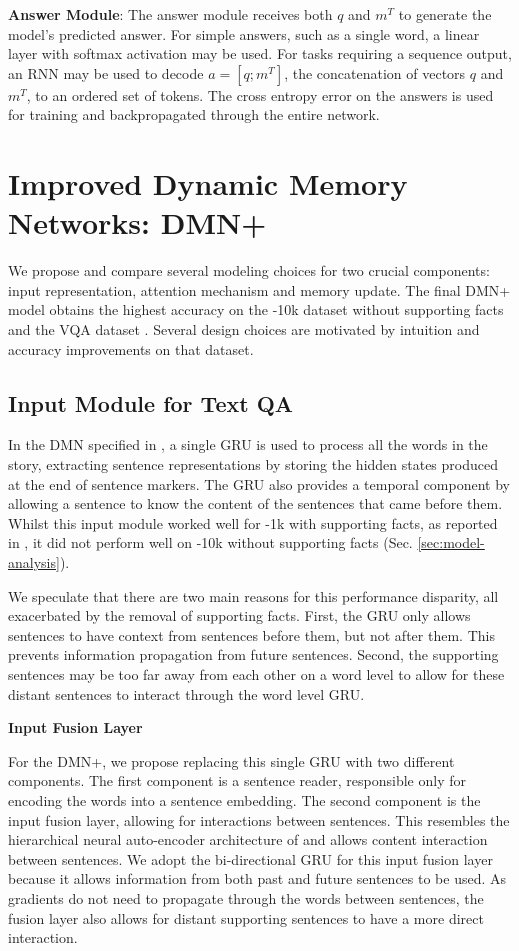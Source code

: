 \documentclass{article}
\begin{document}
\textbf{Answer Module}:
The answer module receives both $q$ and $m^T$ to generate the model's predicted answer.
For simple answers, such as a single word, a linear layer with softmax activation may be used.
For tasks requiring a sequence output, an RNN may be used to decode $a = [q ; m^T]$, the concatenation of vectors $q$ and $m^T$,  to an ordered set of tokens.
The cross entropy error on the answers is used for training and backpropagated through the entire network.


\section{Improved Dynamic Memory Networks: DMN+}
We propose and compare several modeling choices for two crucial components: input representation, attention mechanism and memory update. The final DMN+ model obtains the highest accuracy on the \babi-10k dataset without supporting facts and the VQA dataset \cite{Antol2015}. Several design choices are motivated by intuition and accuracy improvements on that dataset. 



\subsection{Input Module for Text QA} \label{inputTQA}
In the DMN specified in \citet{Kumar2015}, a single GRU is used to process all the words in the story, extracting sentence representations by storing the hidden states produced at the end of sentence markers.
The GRU also provides a temporal component by allowing a sentence to know the content of the sentences that came before them.
Whilst this input module worked well for \babi-1k with supporting facts, as reported in \citet{Kumar2015}, it did not perform well on \babi-10k without supporting facts (Sec. \ref{sec:model-analysis}).

We speculate that there are two main reasons for this performance disparity, all exacerbated by the removal of supporting facts.
First, the GRU only allows sentences to have context from sentences before them, but not after them.
This prevents information propagation from future sentences.
Second, the supporting sentences may be too far away from each other on a word level to allow for these distant sentences to interact through the word level GRU.

\textbf{Input Fusion Layer} \label{sec:fusion}

For the DMN+, we propose replacing this single GRU with two different components.
The first component is a sentence reader, responsible only for encoding the words into a sentence embedding.
The second component is the input fusion layer, allowing for interactions between sentences.
This resembles the hierarchical neural auto-encoder architecture of \citet{Li2015} and allows content interaction between sentences.
We adopt the bi-directional GRU for this input fusion layer because it allows information from both past and future sentences to be used.
As gradients do not need to propagate through the words between sentences, the fusion layer also allows for distant supporting sentences to have a more direct interaction.
\end{document}
